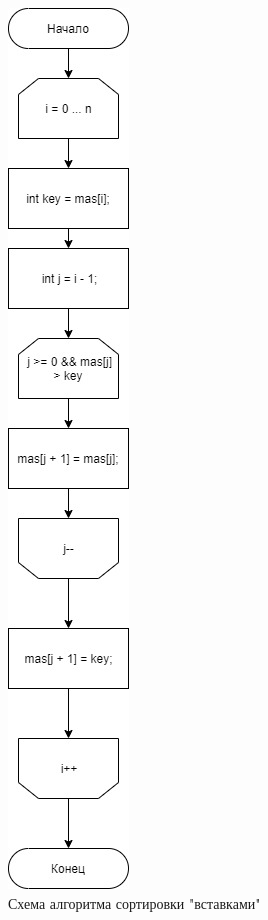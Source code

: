 \documentclass[12pt]{report}
\begin{document}
\begin{figure}[h]
\centering
\includegraphics[scale=0.6]{diag_inst.jpg}
\caption{Схема алгоритма сортировки "вставками"}
\label{fig:mpr}
\end{figure}
\end{document}
